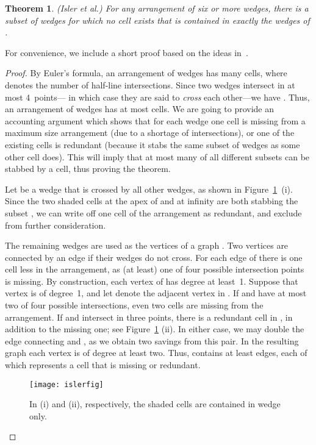 \documentclass[11pt]{article}
\newtheorem{theorem}{Theorem}
\begin{document}
\begin{theorem}         \label{isler-theo}
(Isler et al.) For any arrangement of six or more wedges, there is a subset  of wedges for which
no cell exists that is contained in exactly the wedges of .
\end{theorem}
For convenience, we include a short proof based on the ideas in~\cite{ikdv-vcdev-04}.
\begin{proof}
By Euler's formula, an arrangement of  wedges has  many cells, where 
denotes the number of half-line intersections. Since two wedges intersect in at most 4~points---
in which case they are said to {\em cross} each other---we have
. Thus, an arrangement of  wedges has at most  cells.
We are going to provide an accounting argument which shows that for each wedge
one cell is missing from a maximum size arrangement (due to a shortage of intersections), or
one of the existing cells is redundant (because it stabs the same subset of wedges as some
other cell does). This will imply that at most  many of all  different
subsets can be stabbed by a cell, thus proving the theorem.


Let  be a wedge that is crossed by all other wedges, as shown in Figure~\ref{isler-fig}~(i).
Since the two shaded cells at the apex of  and at infinity are both stabbing the subset ,
we can write off one cell of the arrangement as redundant, and exclude  from further consideration.

The remaining  wedges are used as the vertices of a graph . Two vertices are connected
by an edge if their wedges do not cross. For each edge of  there is one cell less in the arrangement,
as (at least) one of four possible intersection points is missing.
By construction, each vertex of  has degree at least~1. Suppose that vertex 
is of degree~1, and let  denote the adjacent vertex in .
If  and  have at most two of four possible intersections,
even two cells are missing from the arrangement. If  and  intersect in three points,
there is a redundant cell in , in addition to the missing one; see Figure~\ref{isler-fig} (ii).
In either case, we may double the edge connecting  and , as we obtain two savings
from this pair. In the resulting graph  each vertex is of degree at least two. Thus,
 contains at least  edges, each of which represents a cell that is missing or redundant.
\begin{figure}[hbtp]\begin{center}\texttt{[image: islerfig]}\caption{In (i) and (ii), respectively, the shaded cells are contained in wedge  only.}\label{isler-fig}
 \end{center}\end{figure}
\end{proof}
\end{document}
